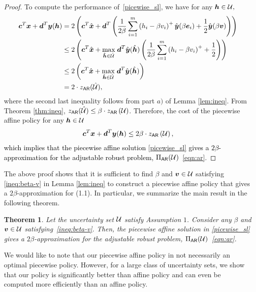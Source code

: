 \documentclass[11pt]{article}
\theoremstyle{plain}
\newtheorem{theorem}{Theorem}[section]
\theoremstyle{definition}
\numberwithin{equation}{section}%
\numberwithin{equation}{section}%
\newcommand{\mb}[1]{\ensuremath{\boldsymbol{#1}}}
\newcommand*{\red}{\textcolor{black}}
\begin{document}
\begin{proof}
To compute the performance of~\eqref{picewise_sl}, we have for any $ \mb h \in {\cal U},$
\begin{align*}
\mb c^{T} \mb x + \mb d^{T} \mb y ( \mb h ) & = 2   \left(   \mb c^{T}    \hat{\mb x}  +    \mb d^{T}  \left( \frac{1}{2\beta} \sum_{i=1}^m \left( h_i -\beta v_i \right)^+ \hat{\mb y }( \beta \mb e_i)+\frac{1}{2}\hat{\mb y }( \beta \mb v)  \right)            \right)\\
& \leq 2  \left(   \mb c^{T}    \hat{\mb x}  +    \underset{ \mb {\hat h} \in   {\hat{\cal U}}} \max \; \mb d^T \hat{\mb y}( \hat{\mb h})  \left( \frac{1}{2 \beta}  \sum_{i=1}^m \left( h_i -\beta v_i  \right)^+ +\frac{1}{2} \right)            \right)\\
& \leq 2 \left(   \mb c^{T}    \hat{\mb x}  +   \underset{ \mb {\hat h} \in   {\hat{\cal U}}} \max \; \mb d^T \hat{\mb y}( \hat{\mb h})            \right)  \\
& = 2  \cdot z_{\sf{AR}}(  {\hat{\cal U}}),
\end{align*}
where the second last inequality follows from part $a)$ of Lemma \ref{lem:ineq}. From Theorem \ref{thm:ineq}, $z_{\sf{AR}}(  {\hat{\cal U}})  \leq   \beta \cdot      z_{\sf{AR}}\left( {\cal U}  \right)$. Therefore, the cost of the piecewise affine policy for any $\mb h \in {\cal U}$
  $$          \mb c^{T} \mb x + \mb d^{T} \mb y ( \mb h )  \leq  2 \beta \cdot z_{\sf{AR}}\left( {\cal U}  \right), $$
\red{which implies that the piecewise affine solution \eqref{picewise_sl} gives a $ 2 \beta$-approximation for the adjustable robust problem, $\Pi_{\sf AR}({\cal U})$~\eqref{eqn:ar}}.
 \end{proof}

The above proof shows that it is sufficient to find $\beta$ and $\mb v \in {\cal U}$ satisfying  \eqref{ineq:beta-v} in Lemma \ref{lem:ineq} to construct a piecewise affine policy that gives a $2 \beta$-approximation for (1.1). In particular, we summarize the main result in the following theorem.

\begin{theorem} \label{thm:addi}
Let the uncertainty set ${\cal U}$ satisfy Assumption $1$. Consider any $\beta $ and $ \mb v \in {\cal U}$ satisfying~\eqref{ineq:beta-v}. Then, the piecewise affine solution in \eqref{picewise_sl} gives a $2\beta$-approximation for the adjustable robust problem, $\Pi_{\sf AR}({\cal U})$~\eqref{eqn:ar}.
\end{theorem}

We would like to note that our piecewise affine policy in not necessarily an optimal piecewise policy. However, for a large class of uncertainty sets, we show that our policy is significantly better than affine policy and can even be computed more efficiently than an affine policy.
\end{document}
